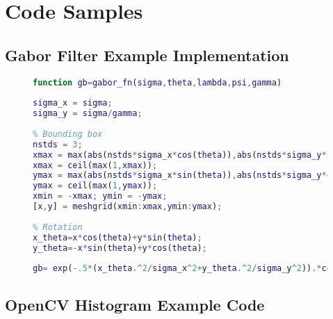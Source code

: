 \chapter{Code Samples}

\section{Gabor Filter Example Implementation}
\begin{figure}[h]
\begin{lstlisting}[language=MATLAB,breaklines=true,
caption={Example implementation of a Gabor Filter in MATLAB from wikipedia\cite{Contributors2012Gabor}}]
function gb=gabor_fn(sigma,theta,lambda,psi,gamma)
 
sigma_x = sigma;
sigma_y = sigma/gamma;
 
% Bounding box
nstds = 3;
xmax = max(abs(nstds*sigma_x*cos(theta)),abs(nstds*sigma_y*sin(theta)));
xmax = ceil(max(1,xmax));
ymax = max(abs(nstds*sigma_x*sin(theta)),abs(nstds*sigma_y*cos(theta)));
ymax = ceil(max(1,ymax));
xmin = -xmax; ymin = -ymax;
[x,y] = meshgrid(xmin:xmax,ymin:ymax);
 
% Rotation 
x_theta=x*cos(theta)+y*sin(theta);
y_theta=-x*sin(theta)+y*cos(theta);
 
gb= exp(-.5*(x_theta.^2/sigma_x^2+y_theta.^2/sigma_y^2)).*cos(2*pi/lambda*x_theta+psi);
\end{lstlisting}
\end{figure}


\section{OpenCV Histogram Example Code}


